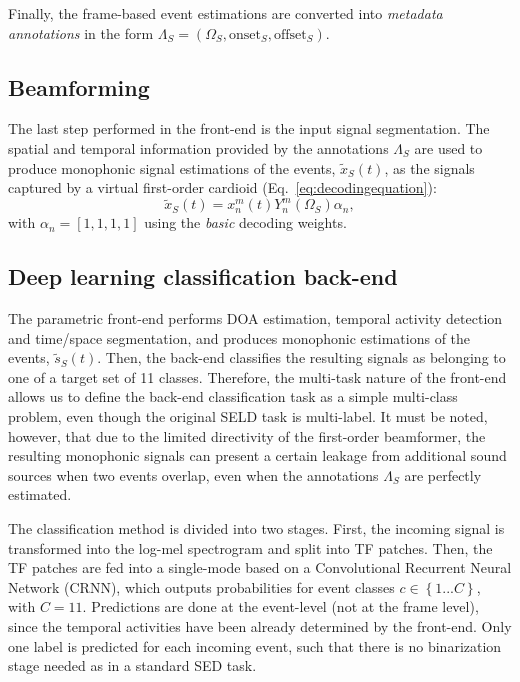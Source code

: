 Finally, the frame-based event estimations are converted into \textit{metadata annotations} in the form $\Lambda_S = (\Omega_S, \text{onset}_S, \text{offset}_S)$.

\subsection{Beamforming}
\label{ssec:Beamforming}

The last step performed in the front-end is the input signal segmentation. The spatial and temporal information provided by the annotations $\Lambda_S$ are used to produce monophonic signal estimations of the events, $\tilde{x}_S(t)$, as the signals captured by a virtual first-order cardioid (Eq.~\ref{eq:decodingequation}):
\begin{equation}
\tilde{x}_S(t) = x_n^m(t) Y_n^m(\Omega_S) \alpha_n,
\end{equation}
with $\alpha_n = [1, 1, 1, 1]$ using the \textit{basic} decoding weights.



\subsection{Deep learning classification back-end}
\label{ssec:backend_method}

The parametric front-end performs DOA estimation, temporal activity detection and time/space segmentation, and produces monophonic estimations of the events, $\tilde{s}_S(t)$.
Then, the back-end classifies the resulting signals as belonging to one of a target set of 11 classes.
Therefore, the multi-task nature of the front-end allows us to define the back-end classification task as a simple multi-class problem, even though the original SELD task is multi-label.
It must be noted, however, that due to the limited directivity of the first-order beamformer, the resulting monophonic signals can present a certain leakage from additional sound sources when two events overlap, even when the annotations $\Lambda_S$ are perfectly estimated.

The classification method is divided into two stages.
First, the incoming signal is transformed into the log-mel spectrogram and split into TF patches.
Then, the TF patches are fed into a single-mode based on a Convolutional Recurrent Neural Network (CRNN), which outputs probabilities for event classes $c \in \left\lbrace 1 ...C \right\rbrace$, with $C=11$.
Predictions are done at the event-level (not at the frame level), since the temporal activities have been already determined by the front-end.
Only one label is predicted for each incoming event, such that there is no binarization stage needed as in a standard SED task.

